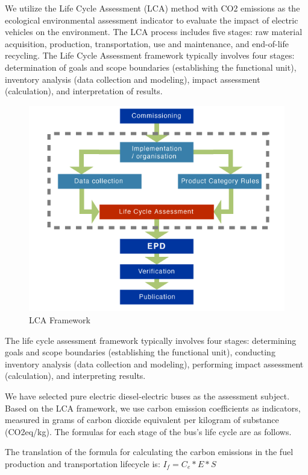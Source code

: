 \documentclass{apmcmthesis}
\begin{document}
We utilize the Life Cycle Assessment (LCA) method with CO2 emissions as the ecological environmental assessment indicator to evaluate the impact of electric vehicles on the environment. The LCA process includes five stages: raw material acquisition, production, transportation, use and maintenance, and end-of-life recycling.
The Life Cycle Assessment framework typically involves four stages: determination of goals and scope boundaries (establishing the functional unit), inventory analysis (data collection and modeling), impact assessment (calculation), and interpretation of results.\cite{HZ}

\begin{figure}[htbp]
    \centering
    \includegraphics[scale=0.5]{figures/Figure/LCA2.png}
    \caption{LCA Framework}
\end{figure}
The life cycle assessment framework typically involves four stages: determining goals and scope boundaries (establishing the functional unit), conducting inventory analysis (data collection and modeling), performing impact assessment (calculation), and interpreting results.\cite{1234}

We have selected pure electric diesel-electric buses as the assessment subject. Based on the LCA framework, we use carbon emission coefficients as indicators, measured in grams of carbon dioxide equivalent per kilogram of substance (CO2eq/kg). The formulas for each stage of the bus's life cycle are as follows.


The translation of the formula for calculating the carbon emissions in the fuel production and transportation lifecycle \cite{1234} is:
$I_f = C_e * E * S$
\end{document}
